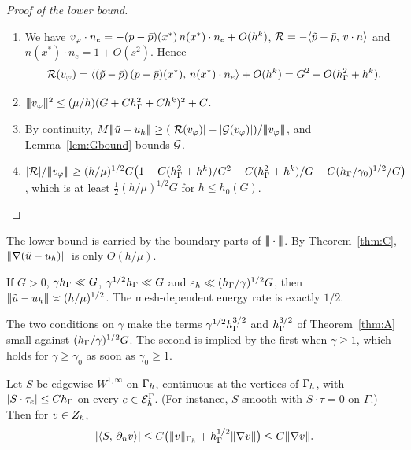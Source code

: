 \begin{proof}[Proof of the lower bound]
\begin{enumerate}
\item We have $v_\varphi\cdot n_e=-(p-\bar p)(x^\ast)\,n(x^\ast)\cdot n_e+O(h^k)$, $\mathcal R=-\langle \tilde p-\bar p,\, v\cdot n\rangle$ and $n(x^\ast)\cdot n_e=1+O(s^2)$. Hence
\[
\mathcal R(v_\varphi)=\langle (\tilde p-\bar p)\,(p-\bar p)(x^\ast),\, n(x^\ast)\cdot n_e\rangle+O(h^k)=G^2+O(h_\Gamma^2+h^k).
\]
\item $|\!|\!|v_\varphi|\!|\!|^2\le(\mu/h)(G+Ch_\Gamma^2+Ch^k)^2+C$.
\item By continuity, $M\tnorm{\ut-u_h}\ge(|\Rc(v_\varphi)|-|\Gc(v_\varphi)|)/\tnorm{v_\varphi}$, and Lemma~\ref{lem:Gbound} bounds $\mathcal G$.
\item $|\mathcal R|/|\!|\!|v_\varphi|\!|\!|\ge(h/\mu)^{1/2}G\bigl(1-C(h_\Gamma^2+h^k)/G^2-C(h_\Gamma^2+h^k)/G-C(h_\Gamma/\gamma_0)^{1/2}/G\bigr)$, which is at least $\frac12(h/\mu)^{1/2}G$ for $h\le h_0(G)$.\qedhere
\end{enumerate}
\end{proof}

The lower bound is carried by the boundary parts of $|\!|\!|\cdot|\!|\!|$. By Theorem~\ref{thm:C}, $\lVert \nabla(\tilde u-u_h)\rVert$ is only $O(h/\mu)$.

\begin{corollary}\label{cor:Aprime}
If $G>0$, $\gamma h_\Gamma\ll G$, $\gamma^{1/2}h_\Gamma\ll G$ and $\varepsilon_h\ll(h_\Gamma/\gamma)^{1/2}G$, then $|\!|\!|\tilde u-u_h|\!|\!|\asymp(h/\mu)^{1/2}$. The mesh-dependent energy rate is exactly $1/2$.
\end{corollary}

The two conditions on $\gamma$ make the terms $\gamma^{1/2}h_\Gamma^{3/2}$ and $h_\Gamma^{3/2}$ of Theorem~\ref{thm:A} small against $(h_\Gamma/\gamma)^{1/2}G$. The second is implied by the first when $\gamma\ge1$, which holds for $\gamma\ge\gamma_0$ as soon as $\gamma_0\ge1$.

\begin{lemma}\label{lem:cancel}
Let $S$ be edgewise $W^{1,\infty}$ on $\Gamma_h$, continuous at the vertices of $\Gamma_h$, with $|S\cdot\tau_e|\le Ch_\Gamma$ on every $e\in\mathcal E_h^\Gamma$. (For instance, $S$ smooth with $S\cdot\tau=0$ on $\Gamma$.) Then for $v\in Z_h$,
\[
|\langle S,\, \partial_n v\rangle|\le C\bigl(\lVert v\rVert_{\Gamma_h}+h_\Gamma^{1/2}\lVert \nabla v\rVert\bigr)\le C\lVert \nabla v\rVert.
\]
\end{lemma}

